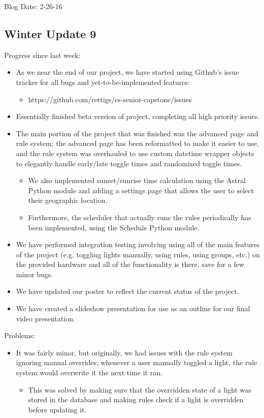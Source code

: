 Blog Date: 2-26-16

\subsection{Winter Update 9}
Progress since last week:
\begin{itemize}
   \item As we near the end of our project, we have started using Github's issue tracker for all bugs and yet-to-be-implemented features:
      \begin{itemize}
         \item https://github.com/rettigs/cs-senior-capstone/issues
      \end{itemize}
   \item Essentially finished beta version of project, completing all high priority issues.
   \item The main portion of the project that was finished was the advanced page and rule system; the advanced page has been reformatted to make it easier to use, and the rule system was overhauled to use custom datetime wrapper objects to elegantly handle early/late toggle times and randomized toggle times.
      \begin{itemize}
         \item We also implemented sunset/sunrise time calculation using the Astral Python module and adding a settings page that allows the user to select their geographic location.
         \item Furthermore, the scheduler that actually runs the rules periodically has been implemented, using the Schedule Python module.
      \end{itemize}
   \item We have performed integration testing involving using all of the main features of the project (e.g. toggling lights manually, using rules, using groups, etc.) on the provided hardware and all of the functionality is there, save for a few minor bugs.
   \item We have updated our poster to reflect the current status of the project.
   \item We have created a slideshow presentation for use as an outline for our final video presentation.
\end{itemize}
Problems:
\begin{itemize}
   \item It was fairly minor, but originally, we had issues with the rule system ignoring manual overrides; whenever a user manually toggled a light, the rule system would overwrite it the next time it ran.
      \begin{itemize}
         \item This was solved by making sure that the overridden state of a light was stored in the database and making rules check if a light is overridden before updating it.
      \end{itemize}
\end{itemize}
